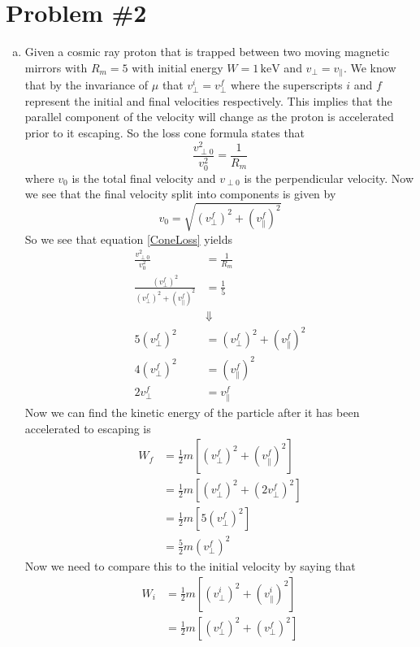 \documentclass[11pt]{article}
\numberwithin{equation}{section}
\newcommand{\unit}[1]{\ensuremath{\, \mathrm{#1}}}
\begin{document}
\section{Problem \#2}
\begin{enumerate}[(a)]
\item
Given a cosmic ray proton that is trapped between two moving magnetic mirrors with $R_m=5$ with initial energy $W=1\unit{keV}$ and $v_{\perp}=v_{\parallel}$. We know that by the invariance of $\mu$ that $v^i_{\perp}=v^f_{\perp}$ where the superscripts $i$ and $f$ represent the initial and final velocities respectively. This implies that the parallel component of the velocity will change as the proton is accelerated prior to it escaping. So the loss cone formula states that
\begin{equation}
\frac{v^2_{\perp0}}{v^2_0} = \frac{1}{R_m}
\label{ConeLoss}
\end{equation}
where $v_0$ is the total final velocity and $v_{\perp0}$ is the perpendicular velocity. Now we see that the final velocity split into components is given by
$$v_0 = \sqrt{(v^f_{\perp})^2+(v^f_{\parallel})^2}$$
So we see that equation \ref{ConeLoss} yields
\begin{align*}
\frac{v^2_{\perp0}}{v^2_0} &= \frac{1}{R_m}\\
\frac{(v^f_{\perp})^2}{(v^f_{\perp})^2+(v^f_{\parallel})^2} &= \frac{1}{5}\\
&\Downarrow\\
5(v^f_{\perp})^2 &= (v^f_{\perp})^2+(v^f_{\parallel})^2\\
4(v^f_{\perp})^2 &= (v^f_{\parallel})^2\\
2v^f_{\perp} &= v^f_{\parallel}
\end{align*}
Now we can find the kinetic energy of the particle after it has been accelerated to escaping is 
\begin{align*}
W_f &= \frac{1}{2}m\left[(v^f_{\perp})^2 + (v^f_{\parallel})^2\right]\\
&= \frac{1}{2}m\left[(v^f_{\perp})^2 + (2v^f_{\perp})^2\right]\\
&= \frac{1}{2}m\left[5(v^f_{\perp})^2\right]\\
&= \frac{5}{2}m(v^f_{\perp})^2
\end{align*}
Now we need to compare this to the initial velocity by saying that
\begin{align*}
W_i &= \frac{1}{2}m\left[(v^i_{\perp})^2 + (v^i_{\parallel})^2\right]\\
&= \frac{1}{2}m\left[(v^f_{\perp})^2 + (v^f_{\perp})^2\right]\\

\end{align*}
\end{enumerate}
\end{document}
